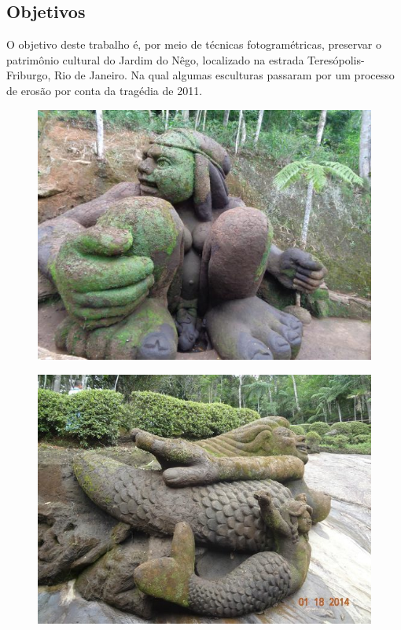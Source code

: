 \documentclass[table, usenames, svgnames, xcolor=dvipsnames]{beamer}
\begin{document}
\subsection{Objetivos}

\begin{frame} 
	\begin{center}
		O objetivo deste trabalho é, por meio de técnicas fotogramétricas, preservar o patrimônio cultural do Jardim do Nêgo, localizado na estrada Teresópolis-Friburgo, Rio de Janeiro. Na qual algumas esculturas passaram por um processo de erosão por conta da tragédia de 2011.
	\end{center}
\end{frame}

\begin{frame} 
	\begin{figure}[!h]
		\centering
		\includegraphics[width=0.7\linewidth]{figs/jardim-do-nego.jpg}
	\end{figure}
\end{frame}

\begin{frame} 
	\begin{figure}[!h]
		\centering
		\includegraphics[width=0.7\linewidth]{figs/jardim-do-nego22.jpg}
	\end{figure}
\end{frame}
\end{document}
